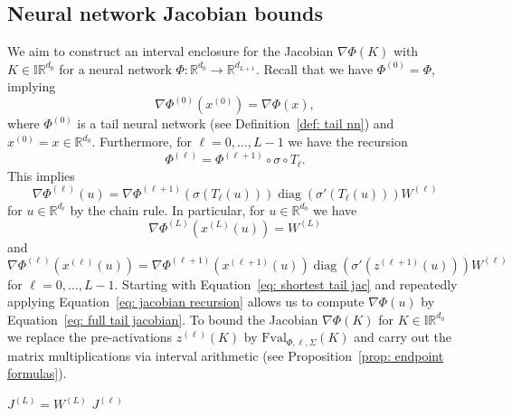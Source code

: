 \documentclass[a4paper, 11pt]{article}
\begin{document}
	\subsection{Neural network Jacobian bounds}\label{subsec:jacobianBounds}
	We aim to construct an interval enclosure for the Jacobian $\nabla\Phi (K)$ with $ K \in \mathbb{IR}^{d_{0}}$ for a neural network $\Phi : \mathbb{R}^{d_0} \to \mathbb{R}^{d_{L+1}}$.
	Recall that we have $  \Phi^{(0)} =\Phi$, implying
	\begin{equation}\label{eq: full tail jacobian}
		\nabla\Phi^{(0)}(x^{(0)}) = \nabla \Phi (x),
	\end{equation}
	where $\Phi^{(0)}$ is a tail neural network (see Definition~\ref{def: tail nn}) and $x^{(0)}=x\in \mathbb{R}^{d_0}$.
	Furthermore, for $\ell=0, \dotsc, L-1$ we have the recursion
	$$
	\Phi^{(\ell)} = \Phi^{(\ell+1)} \circ \sigma \circ T_{\ell}.
	$$
	This implies
	$$ \nabla  \Phi^{(\ell)}(u) = \nabla\Phi^{(\ell+1)}( \sigma( T_{\ell}(u))) \operatorname{diag}(\sigma' (T_\ell(u))) W^{(\ell)}$$
	for $u \in \mathbb{R}^{d_\ell}$ by the chain rule. In particular, for $u \in \mathbb{R}^{d_0}$ we have
	\begin{equation}\label{eq: shortest tail jac}
		\nabla \Phi^{(L)}(x^{(L)}(u)) = W^{(L)} 
	\end{equation}
	and
	\begin{equation}\label{eq: jacobian recursion}
		\nabla  \Phi^{(\ell)}(x^{(\ell)}(u)) = \nabla\Phi^{(\ell+1)}( x^{(\ell+1)}(u)) \operatorname{diag}(\sigma' (z^{(\ell+1)}(u))) W^{(\ell)}
	\end{equation}
	for $\ell=0, \dotsc, L-1$. Starting with Equation~\eqref{eq: shortest tail jac} and repeatedly applying Equation~\eqref{eq: jacobian recursion} allows us to compute $\nabla \Phi(u)$ by Equation~\eqref{eq: full tail jacobian}. To bound the Jacobian $\nabla \Phi(K)$ for $K \in \mathbb{IR}^{d_0}$ we replace the pre-activations $z^{(\ell)}(K)$ by $\mathrm{Fval}_{\Phi, \ell, \Sigma}(K)$ and carry out the matrix multiplications via interval arithmetic (see Proposition~\ref{prop: endpoint formulas}).
	
	\vspace{1em}
	\begin{algorithm}[H]\label{alg: nn jac bounds}
		\LinesNotNumbered
		\DontPrintSemicolon
		\caption{$\mathrm{Jac}_{\Phi,\ell, \Sigma, \Sigma'}(K)$}
		\vspace{1em}
		$J^{(L)} = W^{(L)}$\;
		\Return $J^{(\ell)}$\;
	\end{algorithm}
	\vspace{1em}
	
\end{document}
